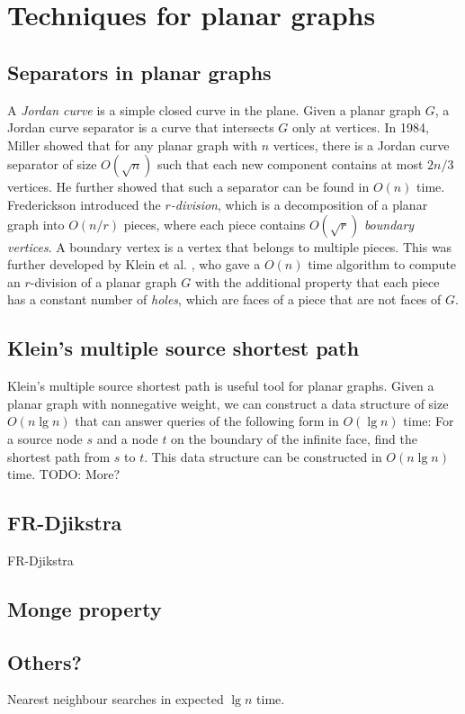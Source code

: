 \section{Techniques for planar graphs}\label{techniques}

\subsection{Separators in planar graphs}
A \textit{Jordan curve} is a simple closed curve in the plane. Given a planar graph $G$,
a Jordan curve separator is a curve that intersects $G$ only at vertices. In 1984, Miller
\cite{miller1984finding} showed that for any planar graph with $n$ vertices, there is a Jordan curve
separator of size $O(\sqrt{n})$ such that each new component contains at most $2n/3$
vertices. He further showed that such a separator can be found in $O(n)$ time. \\
Frederickson introduced the \textit{$r$-division}, which is a decomposition of a planar graph into
$O(n/r)$ pieces, where each piece contains $O(\sqrt{r})$ \textit{boundary vertices}. A
boundary vertex is a vertex that belongs to multiple pieces. This was further developed
by Klein et al. \cite{klein2013structured}, who gave a $O(n)$ time algorithm to compute
an $r$-division of a planar graph $G$ with the additional property that each piece has a constant number of \textit{holes}, which are
faces of a piece that are not faces of $G$.

\subsection{Klein's multiple source shortest path}
Klein's multiple source shortest path \cite{klein2005multiple} is useful tool for planar
graphs. Given a planar graph with nonnegative weight, we can construct a data structure
of size $O(n \lg n)$ that can answer queries of the following form in $O(\lg n)$ time:
For a source node $s$ and a node $t$ on the boundary of the infinite face, find the
shortest path from $s$ to $t$. This data structure can be constructed in $O(n \lg n)$
time. TODO: More?

\subsection{FR-Djikstra}
FR-Djikstra \cite{fakcharoenphol2006planar}\\

\subsection{Monge property}


\subsection{Others?}
Nearest neighbour searches in expected $\lg n$ time. \\

